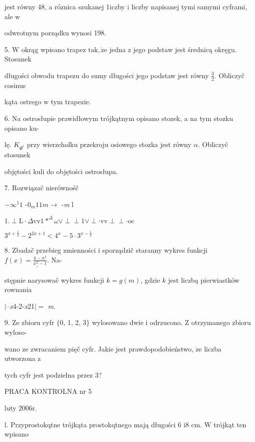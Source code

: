 \documentclass[a4paper,12pt]{article}
\begin{document}
jest równy 48, a róznica szukanej 1iczby $\mathrm{i}$ liczby napisanej tymi samymi cyframi, ale $\mathrm{w}$

odwrotnym porządku wynosi 198.

5. $\mathrm{W}$ okrąg wpisano trapez $\mathrm{t}\mathrm{a}\mathrm{k}, \dot{\mathrm{z}}\mathrm{e}$ jedna $\mathrm{z}$ jego podstaw jest średnicą okręgu. Stosunek

długości obwodu trapezu do sumy długości jego podstaw jest równy $\displaystyle \frac{3}{2}$. Obliczyč cosinus

kąta ostrego $\mathrm{w}$ tym trapezie.

6. Na ostrosłupie prawidłowym trójkątnym opisano stozek, a na tym stozku opisano ku-

lę. $K_{\Phi^{\mathrm{t}}}$ przy wierzcholku przekroju osiowego stozka jest równy $\alpha$. Obliczyč stosunek

objętości kuli do objętości ostrosłupa.

7. Rozwiązač nierównośč

$-\infty^{1}1$ -$0_{m}11 m \rightarrow$ -{\it m} l

$1. \perp \mathrm{L}\cdot\Delta \mathrm{v}\mathrm{v}1*^{\Delta}\omega\vee\perp\perp 1\vee\perp\cdot \mathrm{v}\mathrm{v}\perp\perp\cdot \mathrm{o}\mathrm{c}$

$3^{x+\frac{1}{2}}-2^{2x+1}<4^{x}-5\cdot 3^{x-\frac{1}{2}}$

8. Zbadač przebieg zmienności $\mathrm{i}$ sporządzič staranny wykres funkcji $f(x) = \displaystyle \frac{4-x^{2}}{x_{/}^{2}-1}$. Na-

stępnie narysowač wykres funkcji $k=g(m)$, gdzie $k$ jest liczbą pierwiastków rownania

$|$--{\it x}4-2-{\it x}21$|=$ {\it m}.

9. Ze zbioru cyfr $\{0$, 1, 2, 3$\}$ wylosowano dwie $\mathrm{i}$ odrzucono. $\mathrm{Z}$ otrzymanego zbioru wyloso-

wano ze zwracaniem pięč cyfr. Jakie jest prawdopodobieństwo, $\dot{\mathrm{z}}\mathrm{e}$ liczba utworzona $\mathrm{z}$

tych cyfr jest podzielna przez 3?





PRACA KONTROLNA nr 5

luty $2006\mathrm{r}.$

l. Przyprostokqtne trójkąta prostokqtnego mają długości 6 $\mathrm{i}8$ cm. $\mathrm{W}$ trójkąt ten wpisano
\end{document}
